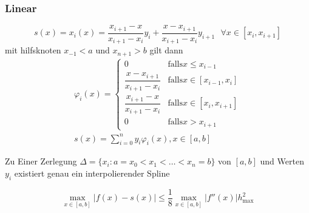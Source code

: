 \documentclass[
	ngerman,
	accentcolor=9c,%
	type=intern,
	marginpar=false
	]{tudapub}
\begin{document}
            \subsubsection{Linear}
                \begin{equation*}
                    s(x) = x_i(x) = \dfrac{x_{i+1} - x}{x_{i+1} - x_i} y_i + \dfrac{x - x_{i+1}}{x_{i+1} - x_i} y_{i+1} \mbox{ }\forall x \in [x_i, x_{i+1}]
                \end{equation*}
                mit hilfsknoten $x_{-1} < a $ und $ x_{n+1} > b$ gilt dann
                \begin{align*}
                    \varphi_i(x) =
                    \begin{cases}
                        0 & \mbox{falls} x \leq x_{i-1}\\
                        \dfrac{x - x_{i+1}}{x_{i+1} - x_i}& \mbox{falls} x \in [x_{i-1}, x_i]\\
                        \dfrac{x_{i+1} - x}{x_{i+1} - x_i}& \mbox{falls} x \in [x_{i}, x_{i+1}]\\
                        0 & \mbox{falls} x > x_{i+1}
                    \end{cases} \\
                    s(x) = \sum_{i=0}^n y_i \varphi_i(x), x \in [a,b]
                \end{align*}
                \begin{satz}
                    Zu Einer Zerlegung $\Delta = \{x_i:a = x_0 < x_1 < \dots < x_n = b\}$ von $[a,b]$ und Werten $y_i$ existiert genau ein interpolierender Spline
                \end{satz}
                \begin{satz}
                    \begin{equation*}
                        \max_{x \in [a,b]} |f(x) - s(x)| \leq \dfrac{1}{8} \max_{x \in [a,b]} | f''(x)| h_{\mbox{max}}^2
                    \end{equation*}
                \end{satz} 
\end{document}
